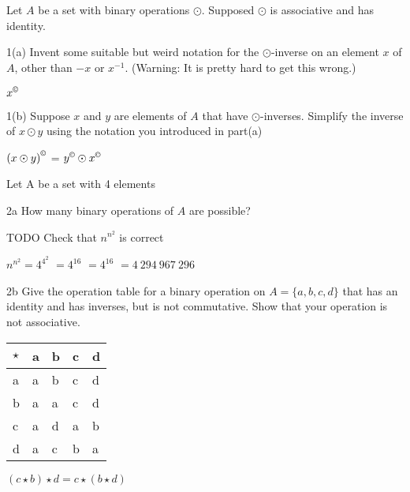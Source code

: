 \begin{question}{1}
Let $A$ be a set with binary operations $\odot$. Supposed $\odot$ is associative and has identity.
\end{question}

\begin{question}{1(a)}
Invent some suitable but weird notation for the $\odot$-inverse on an element $x$ of $A$, other than $-x$ or $x^{-1}$. (Warning: It is pretty hard to get this wrong.)
\end{question}

$x^{\copyright}$

\begin{question}{1(b)}
Suppose $x$ and $y$ are elements of $A$ that have $\odot$-inverses. Simplify the inverse of $x\odot y$ using the notation you introduced in part(a)
\end{question}

${(x\odot y)}^{\copyright}$ = $y^{\copyright}\odot x^{\copyright}$



\begin{question}{2}
Let A be a set with 4 elements
\end{question}

\begin{question}{2a}
How many binary operations of $A$ are possible?
\end{question}

TODO Check that $n^{n^2}$ is correct

$n^{n^2} = 4^{4^2}$
$= 4^{16}$
$= 4^{16}$
$= 4\ 294\ 967\ 296$
\begin{question}{2b}
Give the operation table for a binary operation on $A=\{a,b,c,d\}$ that has an identity and has inverses, but is not commutative. Show that your operation is not associative.
\end{question}

\begin{tabular}{l|llll}
$\star$ & a & b & c & d \\
\hline
a       & a & b & c & d \\
b       & a & a & c & d \\
c       & a & d & a & b \\
d       & a & c & b & a
\end{tabular}

$(c \star b) \star d =  c \star (b \star d)$

